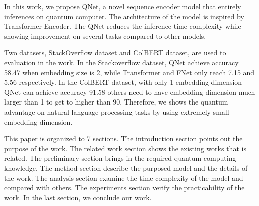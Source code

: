 In this work, we propose QNet, a novel sequence encoder model that entirely inferences on quantum computer. The architecture of the model is inspired by Transformer Encoder. The QNet reduces the inference time complexity while showing improvement on several tasks compared to other models.

Two datasets, StackOverflow dataset and ColBERT dataset, are used to evaluation in the work. In the Stackoverflow dataset, QNet achieve accuracy 58.47 when embedding size is 2, while Transformer and FNet only reach 7.15 and 5.56 respectively. In the ColBERT dataset, with only 1 embedding dimension QNet can achieve accuracy 91.58 others need to have embedding dimension much larger than 1 to get to higher than 90. Therefore, we shows the quantum advantage on natural language processing tasks by using extremely small embedding dimension. 

This paper is organized to 7 sections. The introduction section points out the purpose of the work. The related work section shows the existing works that is related. The preliminary section brings in the required quantum computing knowledge. The method section describe the purposed model and the details of the work. The analysis section examine the time complexity of the model and compared with others. The experiments section verify the practicability of the work. In the last section, we conclude our work.

